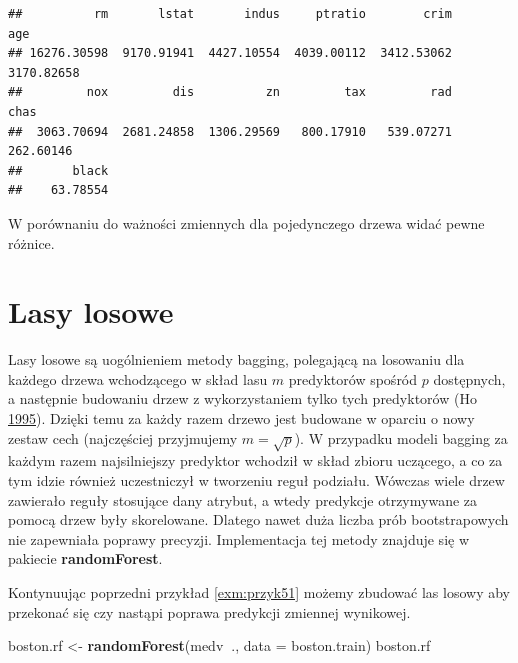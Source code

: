 \documentclass[
]{book}
\newenvironment{Shaded}{\begin{snugshade}}{\end{snugshade}}
\newcommand{\DataTypeTok}[1]{\textcolor[rgb]{0.13,0.29,0.53}{#1}}
\newcommand{\KeywordTok}[1]{\textcolor[rgb]{0.13,0.29,0.53}{\textbf{#1}}}
\newcommand{\NormalTok}[1]{#1}
\newcommand{\OperatorTok}[1]{\textcolor[rgb]{0.81,0.36,0.00}{\textbf{#1}}}
\newcommand{\StringTok}[1]{\textcolor[rgb]{0.31,0.60,0.02}{#1}}
\theoremstyle{plain}
\theoremstyle{definition}
\theoremstyle{definition}
\theoremstyle{definition}
\theoremstyle{definition}
\theoremstyle{remark}
\let\BeginKnitrBlock\begin \let\EndKnitrBlock\end
\begin{document}
\begin{Shaded}
\end{Shaded}

\begin{verbatim}
##          rm       lstat       indus     ptratio        crim         age 
## 16276.30598  9170.91941  4427.10554  4039.00112  3412.53062  3170.82658 
##         nox         dis          zn         tax         rad        chas 
##  3063.70694  2681.24858  1306.29569   800.17910   539.07271   262.60146 
##       black 
##    63.78554
\end{verbatim}

W porównaniu do ważności zmiennych dla pojedynczego drzewa widać pewne różnice.

\hypertarget{lasy-losowe}{%
\section{Lasy losowe}\label{lasy-losowe}}

Lasy losowe są uogólnieniem metody bagging, polegającą na losowaniu dla każdego drzewa wchodzącego w skład lasu \(m\) predyktorów spośród \(p\) dostępnych, a następnie budowaniu drzew z wykorzystaniem tylko tych predyktorów (Ho \protect\hyperlink{ref-ho1995}{1995}). Dzięki temu za każdy razem drzewo jest budowane w oparciu o nowy zestaw cech (najczęściej przyjmujemy \(m=\sqrt{p}\)). W przypadku modeli bagging za każdym razem najsilniejszy predyktor wchodził w skład zbioru uczącego, a co za tym idzie również uczestniczył w tworzeniu reguł podziału. Wówczas wiele drzew zawierało reguły stosujące dany atrybut, a wtedy predykcje otrzymywane za pomocą drzew były skorelowane. Dlatego nawet duża liczba prób bootstrapowych nie zapewniała poprawy precyzji. Implementacja tej metody znajduje się w pakiecie \textbf{randomForest}.

\BeginKnitrBlock{example}
\protect\hypertarget{exm:przyk52}{}{\label{exm:przyk52} }Kontynuując poprzedni przykład \ref{exm:przyk51} możemy zbudować las losowy aby przekonać się czy nastąpi poprawa predykcji zmiennej wynikowej.
\EndKnitrBlock{example}

\begin{Shaded}
\begin{Highlighting}[]
\NormalTok{boston.rf <-}\StringTok{ }\KeywordTok{randomForest}\NormalTok{(medv}\OperatorTok{~}\NormalTok{., }\DataTypeTok{data =}\NormalTok{ boston.train)}
\NormalTok{boston.rf}
\end{Highlighting}
\end{Shaded}
\end{document}
